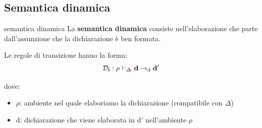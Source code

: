 \subsection{Semantica dinamica}
\begin{mydef}{semantica dinamica}
    La \textbf{semantica dinamica} consiste nell'elaborazione che parte dall'assunzione che la dichiarazione è ben formata.
\end{mydef}

Le regole di transizione hanno la forma:
\[
    \mathcal{D}_\mathbf{i} : \rho \ \textcolor{red}{\mathbf{\vdash_\Delta}} \ \mathbf{d} \to_\mathrm{d} \mathbf{d'}
\]

dove:
\begin{itemize}[label=$\triangleright$, itemsep=\smallskipamount]
    \item $\rho$: ambiente nel quale elaboriamo la dichiarazione (compatibile con $\Delta$)
    \item $\mathrm{d}$: dichiarazione che viene elaborata in $\mathrm{d}'$ nell'ambiente $\rho$
\end{itemize}

